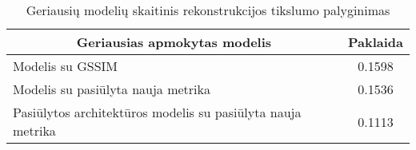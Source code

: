 \begin{table}[]
\centering
\begin{tabular}{@{}p{6.25cm}c@{}}
\toprule
\multicolumn{1}{c}{\textbf{Geriausias apmokytas modelis}} & \multicolumn{1}{c}{\textbf{Paklaida}} \\ \midrule
Modelis su GSSIM & 0.1598 \\ \cmidrule(r){1-1}
Modelis su pasiūlyta nauja metrika & 0.1536 \\ \cmidrule(r){1-1}
Pasiūlytos architektūros modelis su pasiūlyta nauja metrika & 0.1113  \\ \bottomrule
\end{tabular}

\caption{Geriausių modelių skaitinis rekonstrukcijos tikslumo palyginimas}
\label{tab:best-model-comparison}
\end{table}